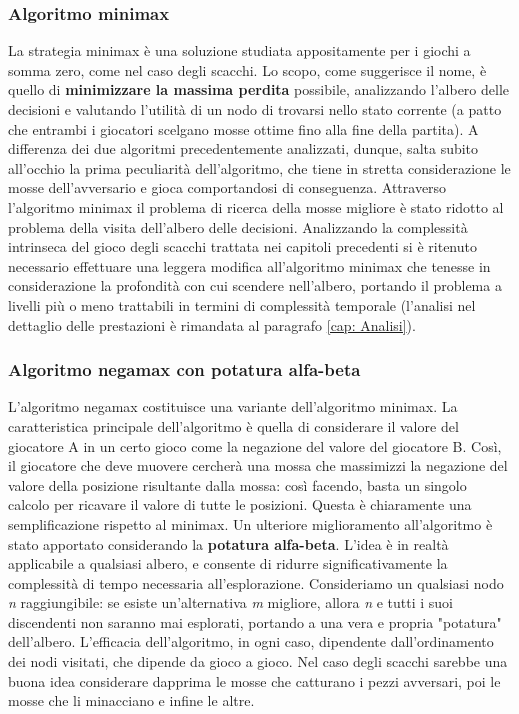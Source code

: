 \subsubsection{Algoritmo minimax}
La strategia minimax è una soluzione studiata appositamente per i giochi a somma zero, come nel caso degli scacchi. Lo scopo, come suggerisce il nome, è quello di \textbf{minimizzare la massima perdita} possibile, analizzando l'albero delle decisioni e valutando l'utilità di un nodo di trovarsi nello stato corrente (a patto che entrambi i giocatori scelgano mosse ottime fino alla fine della partita). A differenza dei due algoritmi precedentemente analizzati, dunque, salta subito all'occhio la prima peculiarità dell'algoritmo, che tiene in stretta considerazione le mosse dell'avversario e gioca comportandosi di conseguenza. Attraverso l'algoritmo minimax il problema di ricerca della mosse migliore è stato ridotto al problema della visita dell'albero delle decisioni. Analizzando la complessità intrinseca del gioco degli scacchi trattata nei capitoli precedenti si è ritenuto necessario effettuare una leggera modifica all'algoritmo minimax che tenesse in considerazione la profondità con cui scendere nell'albero, portando il problema a livelli più o meno trattabili in termini di complessità temporale (l'analisi nel dettaglio delle prestazioni è rimandata al paragrafo \ref{cap: Analisi}).
\subsubsection{Algoritmo negamax con potatura alfa-beta}
L'algoritmo negamax costituisce una variante dell'algoritmo minimax. La caratteristica principale dell'algoritmo è quella di considerare il valore del giocatore A in un certo gioco come la negazione del valore del giocatore B. Così, il giocatore che deve muovere cercherà una mossa che massimizzi la negazione del valore della posizione risultante dalla mossa: così facendo, basta un singolo calcolo per ricavare il valore di tutte le posizioni. Questa è chiaramente una semplificazione rispetto al minimax. Un ulteriore miglioramento all'algoritmo è stato apportato considerando la \textbf{potatura alfa-beta}. L'idea è in realtà applicabile a qualsiasi albero, e consente di ridurre significativamente la complessità di tempo necessaria all'esplorazione. Consideriamo un qualsiasi nodo \textit{n} raggiungibile: se esiste un'alternativa \textit{m} migliore, allora \textit{n} e tutti i suoi discendenti non saranno mai esplorati, portando a una vera e propria "potatura" dell'albero. L'efficacia dell'algoritmo, in ogni caso, dipendente dall'ordinamento dei nodi visitati, che dipende da gioco a gioco. Nel caso degli scacchi sarebbe una buona idea considerare dapprima le mosse che catturano i pezzi avversari, poi le mosse che li minacciano e infine le altre. 

